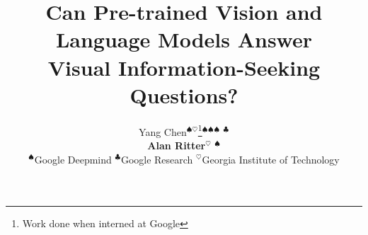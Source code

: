 \documentclass[11pt]{article}
\title{Can Pre-trained Vision and Language Models Answer \\ Visual Information-Seeking Questions?}
\author{
{Yang Chen}$^{\spadesuit\heartsuit}$\thanks{\quad Work done when interned at Google}\quad {Hexiang Hu}$^{\spadesuit}$\quad {Yi Luan}$^{\spadesuit}$\quad {Haitian Sun}$^{\spadesuit}$ \quad {Soravit Changpinyo}$^{\clubsuit}$ \quad \\
{\textbf{Alan Ritter}}$^{\heartsuit}$ \quad {\textbf{Ming-Wei Chang}}$^{\spadesuit}$ \\
$^{\spadesuit}$\xspace {Google Deepmind} \quad
$^{\clubsuit}$\xspace {Google Research} \quad$^{\heartsuit}$\xspace {Georgia Institute of Technology}
}
\begin{document}
\clearpage{}

\newcommand{\backup}[1]{{}}
\newcommand{\nlp}[1]{\texttt{\small #1}}
\newcommand{\snlp}[1]{\texttt{\small #1}}
\newcommand{\entity}[1]{\texttt{\textsc{\small #1}}}




\newcommand{\frank}[1]{{\color{brown}Frank: #1}\xspace}
\newcommand{\yi}[1]{{\color{purple}Yi: #1}\xspace}
\newcommand{\mw}[1]{{\color{blue}Ming-Wei: #1}\xspace}
\newcommand{\yc}[1]{{\color{red}Yang: #1}\xspace}
\newcommand{\ar}[1]{{\color{green}Alan: #1}\xspace}
\newcommand{\beer}[1]{{\color{orange}Beer: #1}\xspace}

\newcommand{\ie}{\textit{i.e}}
\newcommand{\eg}{{\small e.g.}}
\newcommand\mypara[1]{\vspace{1mm}\noindent\textbf{#1}}

\newcommand{\ourdataset}{\textsc{InfoSeek}\xspace}
\newcommand{\infoseek}{\ourdataset}
\newcommand{\palift}{PaLI\xspace}
\newcommand{\ofaft}{OFA\xspace}

\newcommand{\qonly}{PaLM (Q-only)\xspace}




\newcommand{\seen}[0]{{\textsc{Seen}}\xspace}
\newcommand{\unseen}[0]{{\textsc{Unseen}}\xspace}
\newcommand{\nokb}[0]{{\textbf{No-KB}}\xspace}
\newcommand{\withkb}[0]{{\textbf{With-KB}}\xspace}

\newcommand{\pd}{\hphantom{.}}
\newcommand{\pz}{\hphantom{0}}
\newcommand{\pzz}{\hphantom{00}}


\newcommand{\custompara}[1]{{\vspace{1mm}\noindent\textbf{#1}\xspace}}
\newcommand{\entgen}[0]{\textsc{EntGen}\space}
\newcommand{\entret}[0]{\textsc{EntRet}\space}

\newcommand*{\ClipSep}{0.1cm}
\end{document}
